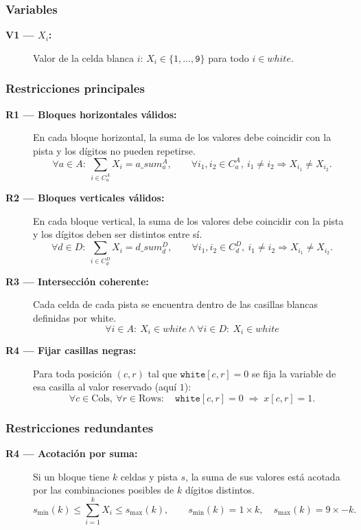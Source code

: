 \subsubsection*{Variables}
\begin{description}
  \item[\textbf{V1 — \(X_i\):}] Valor de la celda blanca \(i\): \(X_i\in\{1,\dots,\texttt{9}\}\) para todo \(i\in white\).
\end{description}

\subsubsection*{Restricciones principales}
\begin{description}
  \item[\textbf{R1 — Bloques horizontales válidos:}] En cada bloque horizontal, la suma de los valores debe coincidir con la pista y los dígitos no pueden repetirse.  
  \[
  \forall a \in A:\ \sum_{i \in C^A_a} X_i = a\_sum^A_a,
  \qquad
  \forall i_1,i_2 \in C^A_a,\ i_1 \neq i_2 \Rightarrow X_{i_1} \neq X_{i_2}.
  \]

  \item[\textbf{R2 — Bloques verticales válidos:}] En cada bloque vertical, la suma de los valores debe coincidir con la pista y los dígitos deben ser distintos entre sí.  
  \[
  \forall d \in D:\ \sum_{i \in C^D_d} X_i = d\_sum^D_d,
  \qquad
  \forall i_1,i_2 \in C^D_d,\ i_1 \neq i_2 \Rightarrow X_{i_1} \neq X_{i_2}.
  \]

  \item[\textbf{R3 — Intersección coherente:}] Cada celda de cada pista se encuentra dentro de las casillas blancas definidas por white.  
  \[
  \forall i \in A:\ X_i \in white \land \forall i \in D:\ X_i \in white
  \]

  \item[\textbf{R4 — Fijar casillas negras:}] Para toda posición \((c,r)\) tal que \(\texttt{white}[c,r]=0\) se fija la variable de esa casilla al valor reservado (aquí \(1\)):
  \[
  \forall c\in\text{Cols},\ \forall r\in\text{Rows}:\quad
  \texttt{white}[c,r]=0 \;\Rightarrow\; x[c,r]=1.
  \]
\end{description}

\subsubsection*{Restricciones redundantes}
\begin{description}
  \item[\textbf{R4 — Acotación por suma:}] Si un bloque tiene \(k\) celdas y pista \(s\), la suma de sus valores está acotada por las combinaciones posibles de \(k\) dígitos distintos.  
  \[
  s_{\min}(k) \le \sum_{i=1}^{k} X_i \le s_{\max}(k),
  \qquad
  s_{\min}(k) = 1 \times k,\quad
  s_{\max}(k) = 9 \times - k.
  \]

\end{description}

